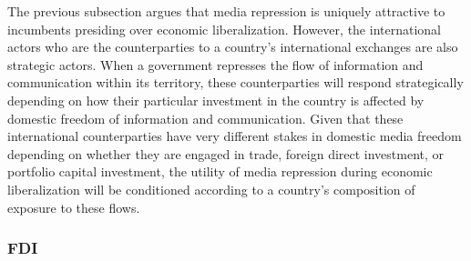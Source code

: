 \documentclass[12pt]{report}
\begin{document}
The previous subsection argues that media repression is uniquely attractive
to incumbents presiding over economic liberalization. However, the
international actors who are the counterparties to a country's international
exchanges are also strategic actors. When a government represses the
flow of information and communication within its territory, these
counterparties will respond strategically depending on how their particular
investment in the country is affected by domestic freedom of information
and communication. Given that these international counterparties have
very different stakes in domestic media freedom depending on whether
they are engaged in trade, foreign direct investment, or portfolio
capital investment, the utility of media repression during economic
liberalization will be conditioned according to a country's composition
of exposure to these flows.

\subsubsection{FDI}
\end{document}
